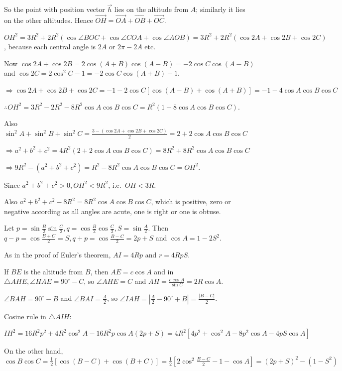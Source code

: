   So the point with position vector $\vec{h}$ lies on the altitude from $A$; similarly it lies on the other
  altitudes. Hence $\vec{OH} = \vec{OA} + \vec{OB} + \vec{OC}$.

  $OH^2 = 3R^2 + 2R^2(\cos\angle BOC + \cos\angle COA + \cos\angle AOB) = 3R^2 + 2R^2(\cos2A + \cos2B +
  \cos2C)$, because each central angle is $2A$ or $2\pi - 2A$ etc.

  Now $\cos2A + \cos2B = 2\cos(A + B)\cos(A - B) = -2\cos C\cos(A - B)$ and $\cos 2C = 2\cos^2C - 1 =
  -2\cos C\cos(A + B) - 1$.

  $\Rightarrow \cos2A + \cos2B + \cos2C = -1 - 2\cos C[\cos(A - B) + \cos(A + B)] = -1 - 4\cos A\cos B\cos C$

  $\therefore OH^2 = 3R^2 - 2R^2 - 8R^2\cos A\cos B\cos C = R^2(1 - 8\cos A\cos B\cos C)$.

  Also $\sin^2A + \sin^2B + \sin^2C = \frac{3 - (\cos2A + \cos2B + \cos2C)}{2} = 2 + 2\cos A\cos B\cos C$

  $\Rightarrow a^2 + b^2 + c^2 = 4R^2(2 + 2\cos A\cos B\cos C) = 8R^2 + 8R^2\cos A\cos B\cos C$

  $\Rightarrow 9R^2 - (a^2 + b^2 + c^2) = R^2 - 8R^2\cos A\cos B\cos C = OH^2$.

  Since $a^2 + b^2 + c^2 > 0, OH^2 < 9R^2$, i.e.\ $OH < 3R$.

  Also $a^2 + b^2 + c^2 - 8R^2 = 8R^2\cos A\cos B\cos C$, which is positive, zero or negative according as
  all angles are acute, one is right or one is obtuse.
\item Let $p = \sin\frac{B}{2}\sin\frac{C}{2}, q = \cos\frac{B}{2}\cos\frac{C}{2}, S = \sin\frac{A}{2}$. Then
  $q - p = \cos\frac{B + C}{2} = S, q + p = \cos\frac{B - C}{2} = 2p + S$ and $\cos A = 1 - 2S^2$.

  As in the proof of Euler's theorem, $AI = 4Rp$ and $r = 4RpS$.

  If $BE$ is the altitude from $B$, then $AE = c\cos A$ and in $\triangle AHE, \angle HAE = 90^\circ - C$, so
  $\angle AHE = C$ and $AH = \frac{c\cos A}{\sin C} = 2R\cos A$.

  $\angle BAH = 90^\circ - B$ and $\angle BAI = \frac{A}{2}$, so $\angle IAH = \left|\frac{A}{2} - 90^\circ +
  B\right| = \frac{|B - C|}{2}$.

  Cosine rule in $\triangle AIH$:

  $IH^2 = 16R^2p^2 + 4R^2\cos^2A - 16R^2p\cos A(2p + S) = 4R^2\left[4p^2 + \cos^2A - 8p^2\cos A - 4pS\cos
  A\right]$

  On the other hand, $\cos B\cos C = \frac{1}{2}[\cos(B - C) + \cos(B + C)] = \frac{1}{2}\left[2\cos^2\frac{B
  - C}{2} - 1 - \cos A\right] = (2p + S)^2 - (1 - S^2)$

